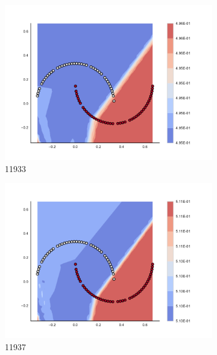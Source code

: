 \begin{figure}[h]
\begin{subfigure}[b]{0.09\textwidth}
    \includegraphics[clip, trim=2.35cm 1.75cm 4.5cm 0cm,width=\textwidth]{img/convergence/11933.pdf}
    \caption{11933}
    \label{fig:convergence_11933}
\end{subfigure}
%
\begin{subfigure}[b]{0.09\textwidth}
    \includegraphics[clip, trim=2.35cm 1.75cm 4.5cm 0cm,width=\textwidth]{img/convergence/11937.pdf}
    \caption{11937}
    \label{fig:convergence_11937}
\end{subfigure}
%
\begin{subfigure}[b]{0.09\textwidth}

\end{subfigure}
\end{figure}
